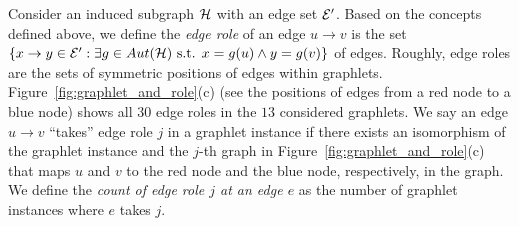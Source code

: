     
	    
	    
            
         
         
	    
	

Consider an induced subgraph $\mathcal{H}$ with an edge set $\mathcal{E}'$.
Based on the concepts defined above, we define the \textit{edge role} of an edge $u\rightarrow v$ is the set $\{x\rightarrow y \in \mathcal{E}' : \exists g \in Aut(\mathcal{H}) \text{ s.t. } x = g(u) \wedge y = g(v)\}$ of edges.
Roughly, edge roles are the sets of symmetric positions of edges within graphlets.
Figure~\ref{fig:graphlet_and_role}(c) (see the positions of edges from a red node to a blue node) shows all $30$ edge roles in the $13$ considered graphlets.
We say an edge $u\rightarrow v$ ``takes'' edge role $j$ in a graphlet instance if there exists an isomorphism of the graphlet instance and the $j$-th graph in Figure~\ref{fig:graphlet_and_role}(c) that maps $u$ and $v$ to the red node and the blue node, respectively, in the graph.
We define the \textit{count of edge role $j$ at an edge $e$} as the number of graphlet instances where $e$ takes $j$.

